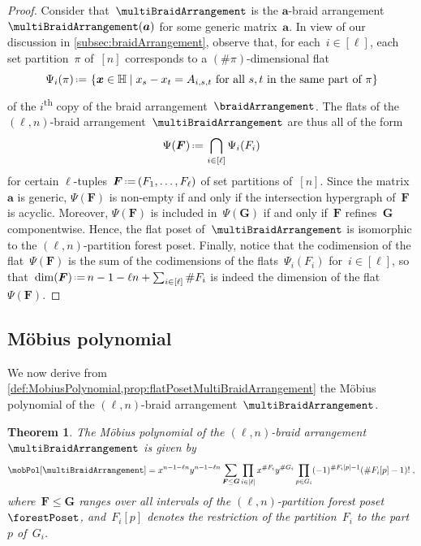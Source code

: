 \documentclass{amsart}
\newtheorem{theorem}{Theorem}[section]
\theoremstyle{definition}
\renewcommand{\b}[1]{{\boldsymbol{#1}}} %
\newcommand{\set}[2]{\left\{ #1 \;\middle|\; #2 \right\}} %
\newcommand{\eqdef}{\mbox{\,\raisebox{0.2ex}{\scriptsize\ensuremath{\mathrm:}}\ensuremath{=}\,}} %
\newcommand{\card}[1]{\##1} %
\newcommand{\ordinal}{\textsuperscript{th}} %
\renewcommand{\b}[1]{\boldsymbol{#1}} %
\newcommand{\HH}{\mathbb{H}} %
\begin{document}
\begin{proof}
Consider that~$\multiBraidArrangement$ is the $\b{a}$-braid arrangement~$\multiBraidArrangement(\b{a})$ for some generic matrix~$\b{a}$.
In view of our discussion in \cref{subsec:braidArrangement}, observe that, for each~${i \in [\ell]}$, each set partition~$\pi$ of~$[n]$ corresponds to a $(\card{\pi})$-dimensional flat
\[
\Psi_i(\pi) \eqdef \set{\b{x} \in \HH}{x_s - x_t = A_{i,s,t} \text{ for all $s,t$ in the same part of $\pi$} }
\]
of the $i$\ordinal{} copy of the braid arrangement~$\braidArrangement$.
The flats of the $(\ell,n)$-braid arrangement~$\multiBraidArrangement$ are thus all of the form
\[
\Psi(\b{F}) \eqdef \bigcap_{i \in [\ell]} \Psi_i(F_i)
\]
for certain $\ell$-tuples~$\b{F} \eqdef (F_1, \dots, F_\ell)$ of set partitions of~$[n]$.
Since the matrix~$\b{a}$ is generic, $\Psi(\b{F})$ is non-empty if and only if the intersection hypergraph of~$\b{F}$ is acyclic.
Moreover, $\Psi(\b{F})$ is included in~$\Psi(\b{G})$ if and only if~$\b{F}$ refines~$\b{G}$ componentwise.
Hence, the flat poset of~$\multiBraidArrangement$ is isomorphic to the $(\ell,n)$-partition forest poset.
Finally, notice that the codimension of the flat~$\Psi(\b{F})$ is the sum of the codimensions of the flats~$\Psi_i(F_i)$ for~$i \in [\ell]$, so that~$\dim(\b{F}) \eqdef n - 1 - \ell n + \sum_{i \in [\ell]} \card{F_i} $ is indeed the dimension of the flat~$\Psi(\b{F})$.
\end{proof}


\subsection{M\"obius polynomial}
\label{subsec:MobiusPolynomialMultiBraidArrangement}

We now derive from \cref{def:MobiusPolynomial,prop:flatPosetMultiBraidArrangement} the M\"obius polynomial of the $(\ell,n)$-braid arrangement~$\multiBraidArrangement$.

\begin{theorem}
\label{thm:MobiusPolynomialMultiBraidArrangement}
The M\"obius polynomial of the $(\ell,n)$-braid arrangement~$\multiBraidArrangement$ is given by
\[
\mobPol[\multiBraidArrangement] = x^{n-1-\ell n} y^{n-1-\ell n} \sum_{\b{F} \le \b{G}} \prod_{i \in [\ell]} x^{\card{F_i}} y^{\card{G_i}} \prod_{p \in G_i} (-1)^{\card{F_i[p]}-1} (\card{F_i[p]}-1)! \; ,
\]
where~$\b{F} \le \b{G}$ ranges over all intervals of the $(\ell,n)$-partition forest poset~$\forestPoset$, and~$F_i[p]$ denotes the restriction of the partition~$F_i$ to the part~$p$ of~$G_i$.
\end{theorem}
\end{document}

